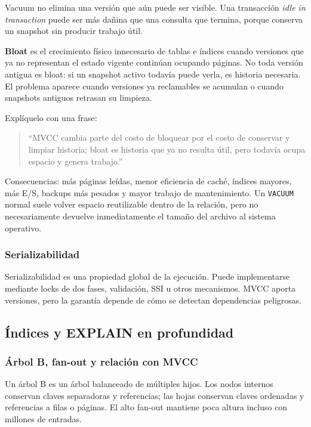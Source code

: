 \documentclass[variant=docente,cover=institutional,mode=screen]{ua-engineering-v6-article}
\begin{document}
Vacuum no elimina una versión que aún puede ser visible. Una transacción \emph{idle in transaction} puede ser más dañina que una consulta que termina, porque conserva un snapshot sin producir trabajo útil.

\textbf{Bloat} es el crecimiento físico innecesario de tablas e índices cuando versiones que ya no representan el estado vigente continúan ocupando páginas. No toda versión antigua es bloat: si un snapshot activo todavía puede verla, es historia necesaria. El problema aparece cuando versiones ya reclamables se acumulan o cuando snapshots antiguos retrasan su limpieza.

Explíquelo con una frase:

\begin{quote}
``MVCC cambia parte del costo de bloquear por el costo de conservar y limpiar historia; bloat es historia que ya no resulta útil, pero todavía ocupa espacio y genera trabajo.''
\end{quote}

Consecuencias: más páginas leídas, menor eficiencia de caché, índices mayores, más E/S, backups más pesados y mayor trabajo de mantenimiento. Un \texttt{VACUUM} normal suele volver espacio reutilizable dentro de la relación, pero no necesariamente devuelve inmediatamente el tamaño del archivo al sistema operativo.

\subsubsection*{Serializabilidad}

Serializabilidad es una propiedad global de la ejecución. Puede implementarse mediante locks de dos fases, validación, SSI u otros mecanismos. MVCC aporta versiones, pero la garantía depende de cómo se detectan dependencias peligrosas.

\subsection{Índices y EXPLAIN en profundidad}

\subsubsection*{Árbol B, fan-out y relación con MVCC}

Un árbol B es un árbol balanceado de múltiples hijos. Los nodos internos conservan claves separadoras y referencias; las hojas conservan claves ordenadas y referencias a filas o páginas. El alto fan-out mantiene poca altura incluso con millones de entradas.
\end{document}
